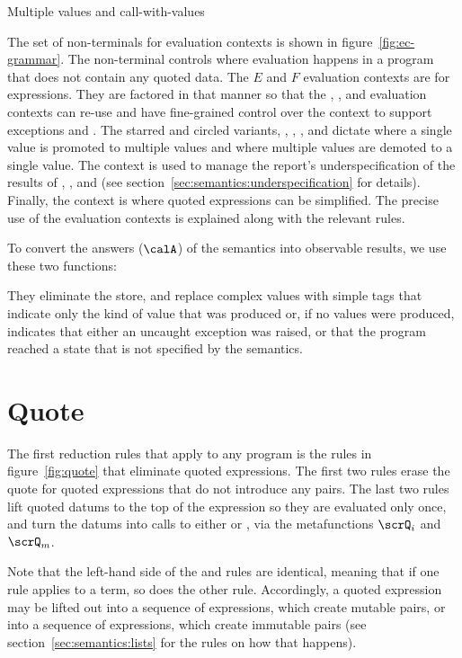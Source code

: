 \beginfig
\begin{center}

\end{center}
\caption{Multiple values and call-with-values}\label{fig:Multiple--values--and--call-with-values}
\endfig

The set of non-terminals for evaluation contexts is shown in
figure~\ref{fig:ec-grammar}. The  non-terminal controls where
evaluation happens in a program that does not contain any quoted data.
The $E$ and $F$ evaluation contexts are for expressions.  They are factored in
that manner so that the , , and  evaluation contexts can
re-use  and have fine-grained control over the context to support
exceptions and . The starred and circled variants,
\Estar{}, \Eo{}, \Fstar{}, and \Fo{} dictate where a single value is
promoted to multiple values and where multiple values are demoted to a
single value. The  context is used to manage the report's underspecification of the results of , , and  (see section~\ref{sec:semantics:underspecification} for details). Finally, the  context is where quoted expressions can be simplified. The precise use of the evaluation contexts is explained along with the relevant rules.

To convert the answers ($\calA$)  of the semantics into observable results, we use these two functions:


They eliminate the store, and replace complex values with simple tags that indicate only the kind of value that was produced or, if no values were produced, indicates that either an uncaught exception was raised, or that the program reached a state that is not specified by the semantics.

\section{Quote}\label{sec:semantics:quote}

The first reduction rules that apply to any program is the 
rules in figure~\ref{fig:quote} that eliminate quoted expressions. 
The first two rules erase the quote for quoted expressions that do not introduce any pairs.
The last two rules lift quoted datums to the top of the expression so
they are evaluated only once, and turn the datums into calls to either  or , via the metafunctions $\scrQ_i$ and $\scrQ_m$.

Note that the left-hand side of the  and  rules are identical, meaning that if one rule applies to a term, so does the other rule. 
Accordingly, a quoted expression may be lifted out into a sequence of  expressions, which create mutable pairs, or into a sequence of  expressions, which create immutable pairs (see section~\ref{sec:semantics:lists} for the rules on how that happens).

